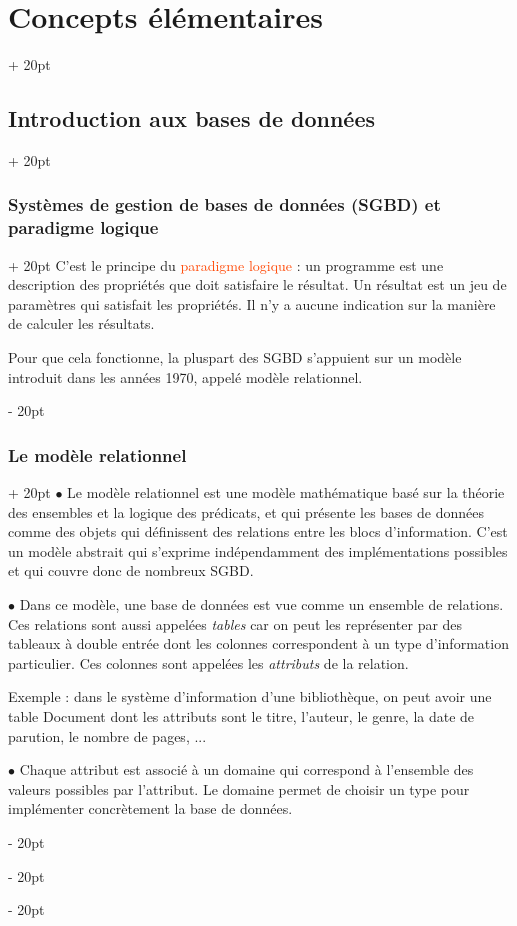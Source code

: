 \documentclass[a4paper, 12pt, twoside]{article}
\renewcommand{\emph}{\textcolor{ff4500}}
\newcommand{\ind}[1][20pt]{\advance\leftskip + #1}
\newcommand{\deind}[1][20pt]{\advance\leftskip - #1}
\newenvironment{indt}[2][20pt]{#2 \par \ind[#1]}{\par \deind} %
\begin{document}
\begin{indt}{\section{Concepts élémentaires}}
\begin{indt}{\subsection{Introduction aux bases de données}}
\begin{indt}{\subsubsection{Systèmes de gestion de bases de données (SGBD) et paradigme logique}}
                C'est le principe du \emph{paradigme logique} : un programme est une description des propriétés que doit satisfaire le résultat. Un résultat est un jeu de paramètres qui satisfait les propriétés. Il n'y a aucune indication sur la manière de calculer les résultats.
                
                Pour que cela fonctionne, la pluspart des SGBD s'appuient sur un modèle introduit dans les années 1970, appelé modèle relationnel.
            \end{indt}
            
            \vspace{12pt}
            
            \begin{indt}{\subsubsection{Le modèle relationnel}}
                $\bullet$ Le modèle relationnel est une modèle mathématique basé sur la théorie des ensembles et la logique des prédicats, et qui présente les bases de données comme des objets qui définissent des relations entre les blocs d'information. C'est un modèle abstrait qui s'exprime indépendamment des implémentations possibles et qui couvre donc de nombreux SGBD.
                
                \vspace{12pt}
                
                $\bullet$ Dans ce modèle, une base de données est vue comme un ensemble de relations. Ces relations sont aussi appelées \textit{tables} car on peut les représenter par des tableaux à double entrée dont les colonnes correspondent à un type d'information particulier. Ces colonnes sont appelées les \textit{attributs} de la relation.
                
                \vspace{6pt}
                
                Exemple : dans le système d'information d'une bibliothèque, on peut avoir une table Document dont les attributs sont le titre, l'auteur, le genre, la date de parution, le nombre de pages, ...
                
                \vspace{12pt}
                
                $\bullet$ Chaque attribut est associé à un domaine qui correspond à l'ensemble des valeurs possibles par l'attribut. Le domaine permet de choisir un type pour implémenter concrètement la base de données.
                

\end{indt}
\end{indt}
\end{indt}
\end{document}

